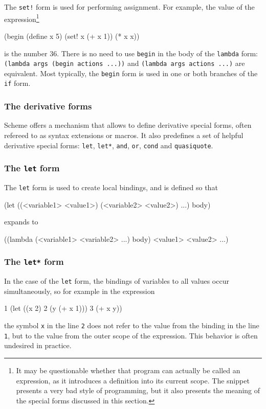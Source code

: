 The \texttt{set!}\,\,form is used for performing assignment.
For example, the value of the expression\footnote{
  It may be questionable whether that program can actually
  be called an expression, as it introduces a definition
  into its current scope. The snippet presents a very
  bad style of programming, but it also presents the meaning
  of the special forms discussed in this section.
}

\begin{Snippet}
  (begin
    (define x 5)
    (set! x (+ x 1))
    (* x x))
\end{Snippet}

is the number 36. There is no need to use \texttt{begin} in
the body of the \texttt{lambda} form: \texttt{(lambda args (begin actions ...))}
and \texttt{(lambda args actions ...)} are equivalent. Most typically,
the \texttt{begin} form is used in one or both branches of the \texttt{if}
form.

\subsubsection{The derivative forms}

Scheme offers a mechanism that allows to define
derivative special forms, often refereed to as syntax extensions
or macros. It also predefines a set of helpful derivative
special forms: \texttt{let}, \texttt{let*}, \texttt{and},
\texttt{or}, \texttt{cond} and \texttt{quasiquote}.

\subsubsection{The \texttt{let} form}

The \texttt{let} form is used to create local bindings,
and is defined so that
\begin{Snippet}
(let ((<variable1> <value1>)
      (<variable2> <value2>)
      ...)
  body)
\end{Snippet}
expands to
\begin{Snippet}
((lambda (<variable1> <variable2> ...) body) <value1> <value2> ...)
\end{Snippet}

\subsubsection{The \texttt{let*} form}

In the case of the \texttt{let} form, the bindings of variables
to all values occur simultaneously, so for example in the expression
\begin{Snippet}
1 (let ((x 2)
2       (y (+ x 1)))
3   (+ x y))
\end{Snippet}
the symbol \texttt{x} in the line \texttt{2} does not refer to the value
from the binding in the line \texttt{1}, but to the value from the outer
scope of the expression. This behavior is often undesired in practice.

